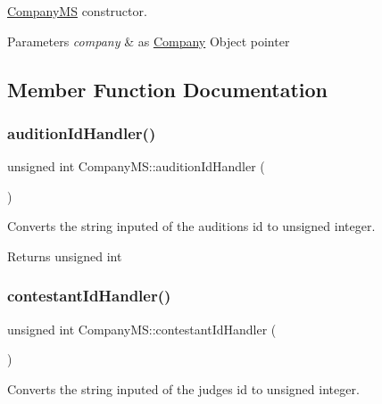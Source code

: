 \hyperlink{class_company_m_s}{Company\+MS} constructor. 


\begin{DoxyParams}{Parameters}
{\em company} & as \hyperlink{class_company}{Company} Object pointer \\
\hline
\end{DoxyParams}


\subsection{Member Function Documentation}
\mbox{\label{class_company_m_s_a3cb95a890e85cb5e4b733033ae34d56a}} 
\subsubsection{\texorpdfstring{audition\+Id\+Handler()}{auditionIdHandler()}}
{\footnotesize\ttfamily unsigned int Company\+M\+S\+::audition\+Id\+Handler (\begin{DoxyParamCaption}{ }\end{DoxyParamCaption})}



Converts the string inputed of the audition\textquotesingle{}s id to unsigned integer. 

\begin{DoxyReturn}{Returns}
unsigned int 
\end{DoxyReturn}
\mbox{\label{class_company_m_s_a084f27a52d2be6d54c82fccca6b1461f}} 
\subsubsection{\texorpdfstring{contestant\+Id\+Handler()}{contestantIdHandler()}}
{\footnotesize\ttfamily unsigned int Company\+M\+S\+::contestant\+Id\+Handler (\begin{DoxyParamCaption}{ }\end{DoxyParamCaption})}



Converts the string inputed of the judge\textquotesingle{}s id to unsigned integer. 

